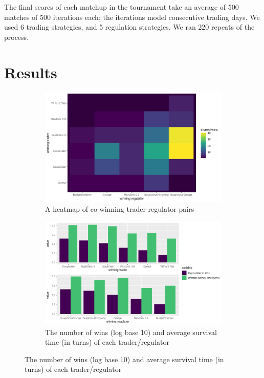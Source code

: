 \documentclass{article}
\begin{document}
The final scores of each matchup in the tournament take an average of 500 matches of 500 iterations each; the iterations model consecutive trading days. We used 6 trading strategies, and 5 regulation strategies. We ran 220 repeats of the process.

\section{Results}
\begin{figure}[!h]
  \begin{subfigure}[c]{0.5\textwidth}
    \includegraphics[width=\textwidth]{heatmap.png}
    \caption{A heatmap of co-winning trader-regulator pairs}
    \label{fig:f1}
  \end{subfigure}
  \hfill
  \begin{subfigure}[c]{0.5\textwidth}
    \includegraphics[width=\textwidth]{barplot.png}
    \caption{The number of wins (log base 10) and average survival time (in turns) of each trader/regulator}
    \label{fig:f2}
  \end{subfigure}
\end{figure}
\end{document}
